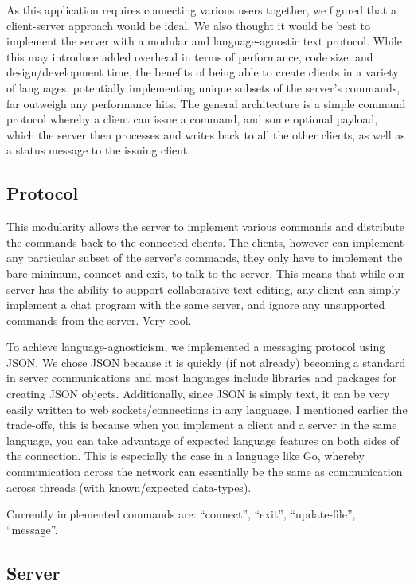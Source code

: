 \documentclass[12pt, letterpaper]{article}
\begin{document}
As this application requires connecting various users together, we 
figured that a client-server approach would be ideal. We also thought 
it would be best to implement the server with a modular and 
language-agnostic text protocol. While this may introduce added 
overhead in terms of performance, code size, and design/development 
time, the benefits of being able to create clients in a variety of 
languages, potentially implementing unique subsets of the server's 
commands, far outweigh any performance hits. The general architecture 
is a simple command protocol whereby a client can issue a command, and 
some optional payload, which the server then processes and writes back 
to all the other clients, as well as a status message to the issuing 
client.

\subsection*{Protocol}

This modularity allows the server to implement various commands and 
distribute the commands back to the connected clients. The clients, 
however can implement any particular subset of the server's commands, 
they only have to implement the bare minimum, connect and exit, to talk 
to the server. This means that while our server has the ability to 
support collaborative text editing, any client can simply implement a 
chat program with the same server, and ignore any unsupported commands 
from the server. Very cool.

To achieve language-agnosticism, we implemented a messaging protocol 
using JSON. We chose JSON because it is quickly (if not already) 
becoming a standard in server communications and most languages include 
libraries and packages for creating JSON objects. Additionally, since 
JSON is simply text, it can be very easily written to web 
sockets/connections in any language. I mentioned earlier the 
trade-offs, this is because when you implement a client and a server in 
the same language, you can take advantage of expected language features 
on both sides of the connection. This is especially the case in a 
language like Go, whereby communication across the network can 
essentially be the same as communication across threads (with 
known/expected data-types).

Currently implemented commands are: ``connect'', ``exit'',
``update-file'', ``message''.

\subsection*{Server}
\end{document}
